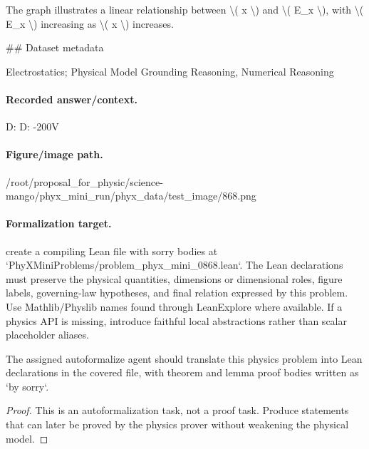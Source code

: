 The graph illustrates a linear relationship between \textbackslash{}( x \textbackslash{}) and \textbackslash{}( E\_x \textbackslash{}), with \textbackslash{}( E\_x \textbackslash{}) increasing as \textbackslash{}( x \textbackslash{}) increases.

\#\# Dataset metadata

Electrostatics; Physical Model Grounding Reasoning, Numerical Reasoning

\paragraph{Recorded answer/context.}
D: D: -200V

\paragraph{Figure/image path.}
/root/proposal\_for\_physic/science-mango/phyx\_mini\_run/phyx\_data/test\_image/868.png

\paragraph{Formalization target.}
create a compiling Lean file with sorry bodies at `PhyXMiniProblems/problem\_phyx\_mini\_0868.lean`. The Lean declarations must preserve the physical quantities, dimensions or dimensional roles, figure labels, governing-law hypotheses, and final relation expressed by this problem.
Use Mathlib/Physlib names found through LeanExplore where available. If a physics API is missing, introduce faithful local abstractions rather than scalar placeholder aliases.

\begin{theorem}
\label{thm:physics:phyx_mini_0868:target}
The assigned autoformalize agent should translate this physics problem into Lean declarations in the covered file, with theorem and lemma proof bodies written as `by sorry`.
\end{theorem}
\begin{proof}
This is an autoformalization task, not a proof task. Produce statements that can later be proved by the physics prover without weakening the physical model.
\end{proof}

